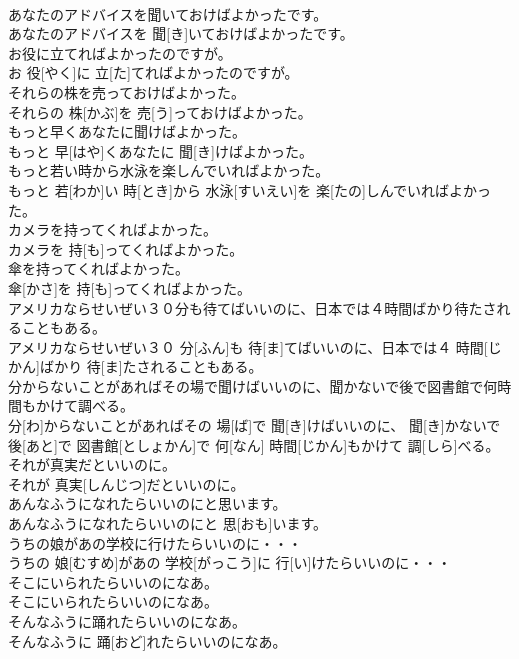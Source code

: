 \documentclass[8pt]{extreport}
\begin{document}
\begin{CJK}{UTF8}{min}
\\	あなたのアドバイスを聞いておけばよかったです。	
\\	あなたのアドバイスを 聞[き]いておけばよかったです。	
\\	お役に立てればよかったのですが。	
\\	お 役[やく]に 立[た]てればよかったのですが。	
\\	それらの株を売っておけばよかった。	
\\	それらの 株[かぶ]を 売[う]っておけばよかった。	
\\	もっと早くあなたに聞けばよかった。	
\\	もっと 早[はや]くあなたに 聞[き]けばよかった。	
\\	もっと若い時から水泳を楽しんでいればよかった。	
\\	もっと 若[わか]い 時[とき]から 水泳[すいえい]を 楽[たの]しんでいればよかった。	
\\	カメラを持ってくればよかった。	
\\	カメラを 持[も]ってくればよかった。	
\\	傘を持ってくればよかった。	
\\	傘[かさ]を 持[も]ってくればよかった。	
\\	アメリカならせいぜい３０分も待てばいいのに、日本では４時間ばかり待たされることもある。	
\\	アメリカならせいぜい３０ 分[ふん]も 待[ま]てばいいのに、日本では４ 時間[じかん]ばかり 待[ま]たされることもある。	
\\	分からないことがあればその場で聞けばいいのに、聞かないで後で図書館で何時間もかけて調べる。	
\\	分[わ]からないことがあればその 場[ば]で 聞[き]けばいいのに、 聞[き]かないで 後[あと]で 図書館[としょかん]で 何[なん] 時間[じかん]もかけて 調[しら]べる。	
\\	それが真実だといいのに。	
\\	それが 真実[しんじつ]だといいのに。	
\\	あんなふうになれたらいいのにと思います。	
\\	あんなふうになれたらいいのにと 思[おも]います。	
\\	うちの娘があの学校に行けたらいいのに・・・	
\\	うちの 娘[むすめ]があの 学校[がっこう]に 行[い]けたらいいのに・・・	
\\	そこにいられたらいいのになあ。	
\\	そこにいられたらいいのになあ。	
\\	そんなふうに踊れたらいいのになあ。	
\\	そんなふうに 踊[おど]れたらいいのになあ。	

\end{CJK}
\end{document}
